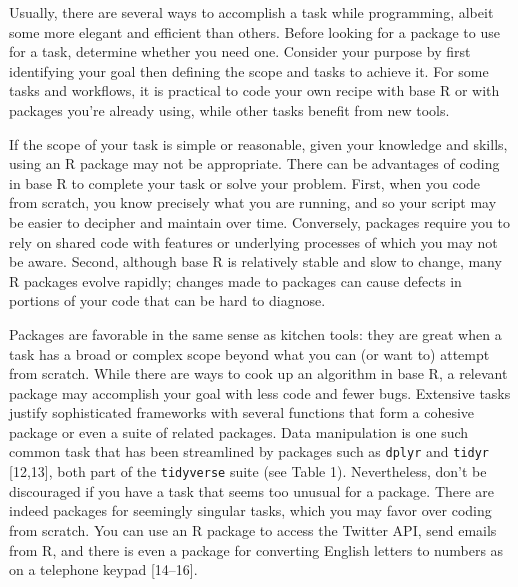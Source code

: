 \documentclass[10pt,letterpaper]{article}
\begin{document}
Usually, there are several ways to accomplish a task while programming,
albeit some more elegant and efficient than others. Before looking for a
package to use for a task, determine whether you need one. Consider your
purpose by first identifying your goal then defining the scope and tasks
to achieve it. For some tasks and workflows, it is practical to code
your own recipe with base R or with packages you're already using, while
other tasks benefit from new tools.

If the scope of your task is simple or reasonable, given your knowledge
and skills, using an R package may not be appropriate. There can be
advantages of coding in base R to complete your task or solve your
problem. First, when you code from scratch, you know precisely what you
are running, and so your script may be easier to decipher and maintain
over time. Conversely, packages require you to rely on shared code with
features or underlying processes of which you may not be aware. Second,
although base R is relatively stable and slow to change, many R packages
evolve rapidly; changes made to packages can cause defects in portions
of your code that can be hard to diagnose.

Packages are favorable in the same sense as kitchen tools: they are
great when a task has a broad or complex scope beyond what you can (or
want to) attempt from scratch. While there are ways to cook up an
algorithm in base R, a relevant package may accomplish your goal with
less code and fewer bugs. Extensive tasks justify sophisticated
frameworks with several functions that form a cohesive package or even a
suite of related packages. Data manipulation is one such common task
that has been streamlined by packages such as \texttt{dplyr} and
\texttt{tidyr} {[}12,13{]}, both part of the \texttt{tidyverse} suite
(see Table 1). Nevertheless, don't be discouraged if you have a task
that seems too unusual for a package. There are indeed packages for
seemingly singular tasks, which you may favor over coding from scratch.
You can use an R package to access the Twitter API, send emails from R,
and there is even a package for converting English letters to numbers as
on a telephone keypad {[}14--16{]}.
\end{document}
